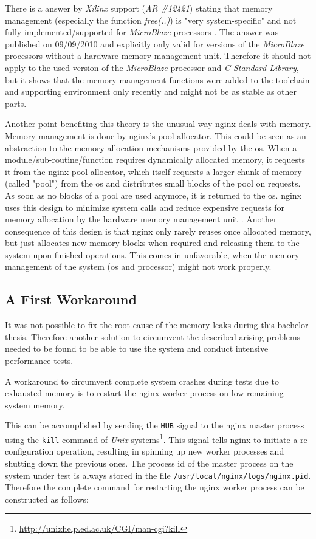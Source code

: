 There is a answer by \textit{Xilinx} support (\textit{AR \#12421}) stating that memory management (especially the function \textit{free(..)}) is "very system-specific" and not fully implemented/supported for \textit{MicroBlaze} processors \cite{mbfree}. The answer was published on 09/09/2010 and explicitly only valid for versions of the \textit{MicroBlaze} processors without a hardware memory management unit. Therefore it should not apply to the used version of the \textit{MicroBlaze} processor and \textit{C Standard Library}, but it shows that the memory management functions were added to the toolchain and supporting environment only recently and might not be as stable as other parts.

Another point benefiting this theory is the unusual way nginx deals with memory. Memory management is done by nginx's pool allocator. This could be seen as an abstraction to the memory allocation mechanisms provided by the \gls{os}. When a module/sub-routine/function requires dynamically allocated memory, it requests it from the nginx pool allocator, which itself requests a larger chunk of memory (called "pool") from the \gls{os} and distributes small blocks of the pool on requests. As soon as no blocks of a pool are used anymore, it is returned to the \gls{os}. nginx uses this design to minimize system calls and reduce expensive requests for memory allocation by the hardware memory management unit \cite{aosa}. Another consequence of this design is that nginx only rarely reuses once allocated memory, but just allocates new memory blocks when required and releasing them to the system upon finished operations. This comes in unfavorable, when the memory management of the system (\gls{os} and processor) might not work properly.

\subsection{A First Workaround}

It was not possible to fix the root cause of the memory leaks during this bachelor thesis. Therefore another solution to circumvent the described arising problems needed to be found to be able to use the system and conduct intensive performance tests.

A workaround to circumvent complete system crashes during tests due to exhausted memory is to restart the nginx worker process on low remaining system memory.

This can be accomplished by sending the \texttt{HUB} signal to the nginx master process using the \texttt{kill} command of \textit{Unix} systems\footnote{\url{http://unixhelp.ed.ac.uk/CGI/man-cgi?kill}}. This signal tells nginx to initiate a re-configuration operation, resulting in spinning up new worker processes and shutting down the previous ones. The process id of the master process on the system under test is always stored in the file \texttt{/usr/local/nginx/logs/nginx.pid}. Therefore the complete command for restarting the nginx worker process can be constructed as follows:

